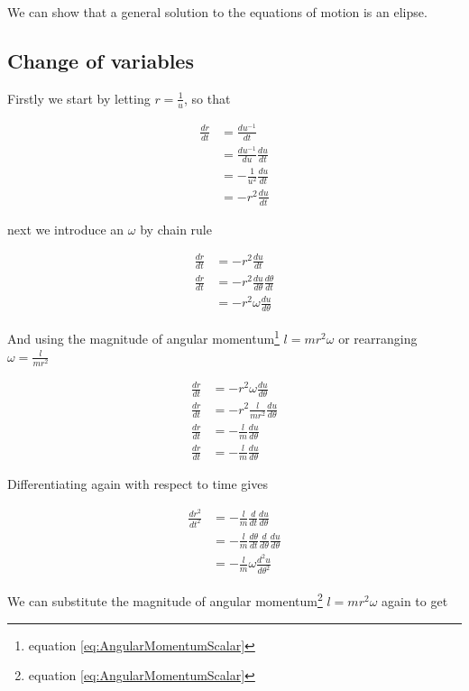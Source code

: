 We can show that a general solution to the equations of motion is an elipse.

\subsection{Change of variables}
Firstly we start by letting $r=\frac{1}{u}$, so that

\begin{align}
\frac{dr}{dt} &= \frac{du^{-1}}{dt}\nonumber \\
&= \frac{du^{-1}}{du}\frac{du}{dt}\nonumber \\
&= -\frac{1}{u^2}\frac{du}{dt}\nonumber \\
&= -r^2\frac{du}{dt}
\end{align}

next we introduce an $\omega$ by chain rule

\begin{align}
\frac{dr}{dt}
&= -r^2\frac{du}{dt}\nonumber \\
\frac{dr}{dt} &= -r^2\frac{du}{d\theta}\frac{d\theta}{dt} \nonumber \\
&= -r^2\omega\frac{du}{d\theta} \nonumber
\end{align}

And using the magnitude of angular momentum\footnote{equation \ref{eq:AngularMomentumScalar}} $l=mr^2\omega$ or rearranging $\omega = \frac{l}{mr^2}$

\begin{align}
\frac{dr}{dt}&= -r^2\omega\frac{du}{d\theta} \nonumber \\
\frac{dr}{dt}&= -r^2\frac{l}{mr^2}\frac{du}{d\theta} \nonumber \\
\frac{dr}{dt}&= -\frac{l}{m}\frac{du}{d\theta} \nonumber \\
\frac{dr}{dt}&= -\frac{l}{m}\frac{du}{d\theta}
\end{align}

Differentiating again with respect to time gives

\begin{align}
\frac{dr^2}{dt^2}&= -\frac{l}{m}\frac{d}{dt}\frac{du}{d\theta} \nonumber \\
&= -\frac{l}{m}\frac{d\theta}{dt}\frac{d}{d\theta}\frac{du}{d\theta}\nonumber \\
&= -\frac{l}{m}\omega\frac{d^2u}{d\theta^2}
\end{align}

We can substitute the magnitude of angular momentum\footnote{equation \ref{eq:AngularMomentumScalar}} $l=mr^2\omega$ again to get

